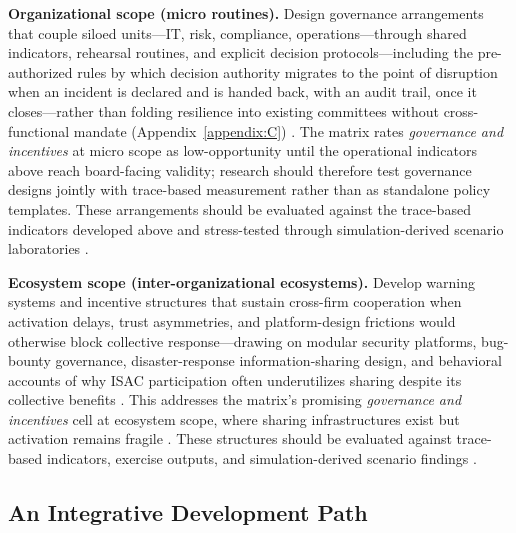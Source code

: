 \textbf{Organizational scope (micro routines).} Design governance arrangements that couple siloed units---IT, risk, compliance, operations---through shared indicators, rehearsal routines, and explicit decision protocols---including the pre-authorized rules by which decision authority migrates to the point of disruption when an incident is declared and is handed back, with an audit trail, once it closes---rather than folding resilience into existing committees without cross-functional mandate (Appendix~\ref{appendix:C}) \autocite{weick2011managing,bhamra2011resilience}. The matrix rates \emph{governance and incentives} at micro scope as low-opportunity until the operational indicators above reach board-facing validity; research should therefore test governance designs jointly with trace-based measurement rather than as standalone policy templates. These arrangements should be evaluated against the trace-based indicators developed above and stress-tested through simulation-derived scenario laboratories \autocite{weick2011managing,bhamra2011resilience}.

\textbf{Ecosystem scope (inter-organizational ecosystems).} Develop warning systems and incentive structures that sustain cross-firm cooperation when activation delays, trust asymmetries, and platform-design frictions would otherwise block collective response---drawing on modular security platforms, bug-bounty governance, disaster-response information-sharing design, and behavioral accounts of why ISAC participation often underutilizes sharing despite its collective benefits \autocite{arnold2004informationsharing,maillart2017bugbounty,mermoud2019share,lostri2022shared}. This addresses the matrix's promising \emph{governance and incentives} cell at ecosystem scope, where sharing infrastructures exist but activation remains fragile \autocite{mermoud2019share,gillard2023efficient}. These structures should be evaluated against trace-based indicators, exercise outputs, and simulation-derived scenario findings \autocite{arnold2004informationsharing,maillart2017bugbounty,mermoud2019share,lostri2022shared}.

\subsection{An Integrative Development Path}

